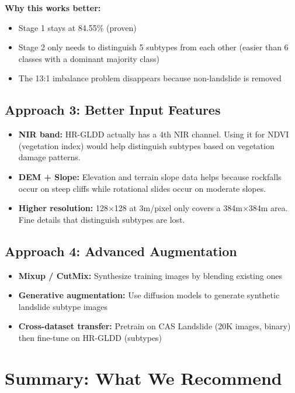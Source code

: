\documentclass[12pt,a4paper]{article}
\begin{document}
\textbf{Why this works better:}
\begin{itemize}
    \item Stage 1 stays at 84.55\% (proven)
    \item Stage 2 only needs to distinguish 5 subtypes from each other (easier than 6 classes with a dominant majority class)
    \item The 13:1 imbalance problem disappears because non-landslide is removed
\end{itemize}

\subsection{Approach 3: Better Input Features}

\begin{itemize}
    \item \textbf{NIR band:} HR-GLDD actually has a 4th NIR channel. Using it for NDVI (vegetation index) would help distinguish subtypes based on vegetation damage patterns.
    \item \textbf{DEM + Slope:} Elevation and terrain slope data helps because rockfalls occur on steep cliffs while rotational slides occur on moderate slopes.
    \item \textbf{Higher resolution:} 128$\times$128 at 3m/pixel only covers a 384m$\times$384m area. Fine details that distinguish subtypes are lost.
\end{itemize}

\subsection{Approach 4: Advanced Augmentation}

\begin{itemize}
    \item \textbf{Mixup / CutMix:} Synthesize training images by blending existing ones
    \item \textbf{Generative augmentation:} Use diffusion models to generate synthetic landslide subtype images
    \item \textbf{Cross-dataset transfer:} Pretrain on CAS Landslide (20K images, binary) then fine-tune on HR-GLDD (subtypes)
\end{itemize}

\section{Summary: What We Recommend}
\end{document}
